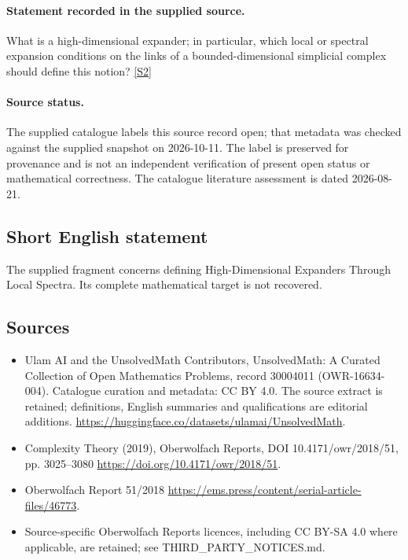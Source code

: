 \documentclass[11pt]{article}
\newcommand{\sref}[2]{\hyperlink{source:#1:#2}{[S#2]}}
\begin{document}
\paragraph{Statement recorded in the supplied source.}
What is a high-dimensional expander; in particular, which local or spectral expansion conditions on the links of a bounded-dimensional simplicial complex should define this notion? \sref{30004011}{2}
\paragraph{Source status.}
The supplied catalogue labels this source record open; that metadata was checked against the supplied snapshot on 2026-10-11. The label is preserved for provenance and is not an independent verification of present open status or mathematical correctness. The catalogue literature assessment is dated 2026-08-21.
\subsection{Short English statement}
The supplied fragment concerns defining High-Dimensional Expanders Through Local Spectra. Its complete mathematical target is not recovered.
\subsection{Sources}
\begin{itemize}
\item[\hypertarget{source:30004011:1}{S1}] Ulam AI and the UnsolvedMath Contributors, UnsolvedMath: A Curated Collection of Open Mathematics Problems, record 30004011 (OWR-16634-004). Catalogue curation and metadata: CC BY 4.0. The source extract is retained; definitions, English summaries and qualifications are editorial additions.
\url{https://huggingface.co/datasets/ulamai/UnsolvedMath}.
\item[\hypertarget{source:30004011:2}{S2}] Complexity Theory (2019), Oberwolfach Reports, DOI 10.4171/owr/2018/51, pp. 3025--3080
\url{https://doi.org/10.4171/owr/2018/51}.
\item[\hypertarget{source:30004011:3}{S3}] Oberwolfach Report 51/2018
\url{https://ems.press/content/serial-article-files/46773}.
\item Source-specific Oberwolfach Reports licences, including CC BY-SA 4.0 where applicable, are retained; see THIRD\_PARTY\_NOTICES.md.
\end{itemize}
\end{document}
